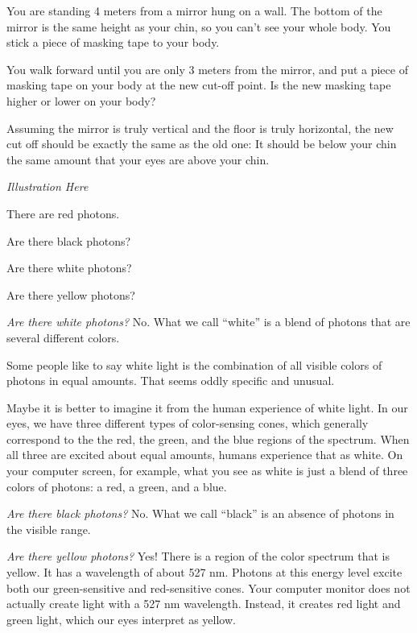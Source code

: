 \begin{Exercise}[title={Law of Reflection}, label=law_of_reflection]

  You are standing 4 meters from a mirror hung on a wall.  The bottom
  of the mirror is the same height as your chin, so you can't see your
  whole body.  You stick a piece of masking tape to your body.

  You walk forward until you are only 3 meters from the mirror, and
  put a piece of masking tape on your body at the new cut-off point.  Is the new
  masking tape higher or lower on your body?
  
\end{Exercise}
\begin{Answer}[ref=law_of_reflection]

 Assuming the mirror is truly vertical and the floor is truly
 horizontal, the new cut off should be exactly the same as the old
 one: It should be below your chin the same amount that your eyes are
 above your chin.

 \textit{Illustration Here}

\end{Answer}

\begin{Exercise}[title={Photons and Color}, label=photon_color]

  There are red photons.

  Are there black photons?

  Are there white photons?

  Are there yellow photons?
  
\end{Exercise}
\begin{Answer}
  
\textit{Are there white photons?}  No. What we call ``white'' is a
blend of photons that are several different colors.

Some people like to say white light is the combination of all visible
colors of photons in equal amounts. That seems oddly specific and unusual.

Maybe it is better to imagine it from the human experience of white
light. In our eyes, we have three different types of color-sensing
cones, which generally correspond to the the red, the green, and the
blue regions of the spectrum.  When all three are excited about equal
amounts, humans experience that as white.  On your computer screen,
for example, what you see as white is just a blend of three colors of
photons: a red, a green, and a blue.

\textit{Are there black photons?}  No. What we call ``black'' is an
absence of photons in the visible range.

\textit{Are there yellow photons?} Yes! There is a region of the color
spectrum that is yellow. It has a wavelength of about 527 nm.  Photons
at this energy level excite both our green-sensitive and red-sensitive
cones.
Your computer monitor does not actually create light with a 527 nm
wavelength. Instead, it creates red light and green light, which our
eyes interpret as yellow.

\end{Answer}

